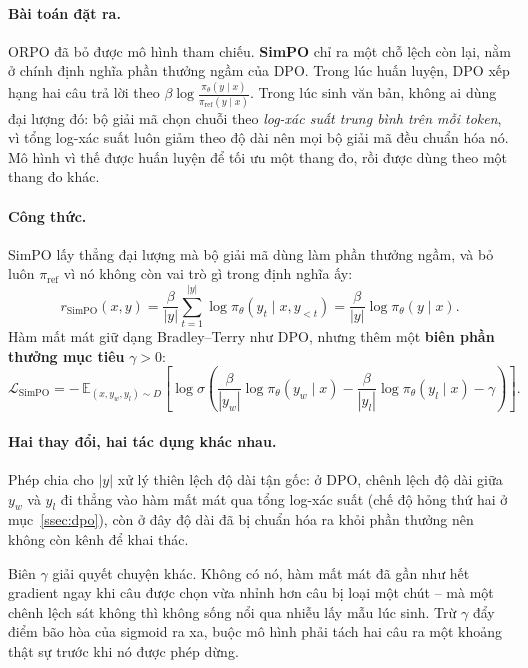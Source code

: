 \paragraph{Bài toán đặt ra.} ORPO đã bỏ được mô hình tham chiếu. \textbf{SimPO} \cite{meng2024simpo} chỉ ra một chỗ lệch còn lại, nằm ở chính định nghĩa phần thưởng ngầm của DPO. Trong lúc huấn luyện, DPO xếp hạng hai câu trả lời theo \( \beta \log \frac{\pi_\theta(y\mid x)}{\pi_{\text{ref}}(y\mid x)} \). Trong lúc sinh văn bản, không ai dùng đại lượng đó: bộ giải mã chọn chuỗi theo \emph{log-xác suất trung bình trên mỗi token}, vì tổng log-xác suất luôn giảm theo độ dài nên mọi bộ giải mã đều chuẩn hóa nó. Mô hình vì thế được huấn luyện để tối ưu một thang đo, rồi được dùng theo một thang đo khác.

\paragraph{Công thức.} SimPO lấy thẳng đại lượng mà bộ giải mã dùng làm phần thưởng ngầm, và bỏ luôn \( \pi_{\text{ref}} \) vì nó không còn vai trò gì trong định nghĩa ấy:
\[
	r_{\text{SimPO}}(x,y) = \frac{\beta}{|y|}\sum_{t=1}^{|y|} \log \pi_\theta(y_t \mid x, y_{<t})
	= \frac{\beta}{|y|} \log \pi_\theta(y \mid x).
\]
Hàm mất mát giữ dạng Bradley--Terry như DPO, nhưng thêm một \textbf{biên phần thưởng mục tiêu} \( \gamma > 0 \):
\[
	\mathcal{L}_{\text{SimPO}}
	= -\,\mathbb{E}_{(x,y_w,y_l)\sim D}
	\left[ \log\sigma\!\left(
		\frac{\beta}{|y_w|}\log \pi_\theta(y_w \mid x)
		- \frac{\beta}{|y_l|}\log \pi_\theta(y_l \mid x)
		- \gamma
	\right) \right].
\]

\paragraph{Hai thay đổi, hai tác dụng khác nhau.} Phép chia cho \( |y| \) xử lý thiên lệch độ dài tận gốc: ở DPO, chênh lệch độ dài giữa \( y_w \) và \( y_l \) đi thẳng vào hàm mất mát qua tổng log-xác suất (chế độ hỏng thứ hai ở mục~\ref{ssec:dpo}), còn ở đây độ dài đã bị chuẩn hóa ra khỏi phần thưởng nên không còn kênh để khai thác.

Biên \( \gamma \) giải quyết chuyện khác. Không có nó, hàm mất mát đã gần như hết gradient ngay khi câu được chọn vừa nhỉnh hơn câu bị loại một chút -- mà một chênh lệch sát không thì không sống nổi qua nhiễu lấy mẫu lúc sinh. Trừ \( \gamma \) đẩy điểm bão hòa của sigmoid ra xa, buộc mô hình phải tách hai câu ra một khoảng thật sự trước khi nó được phép dừng.

